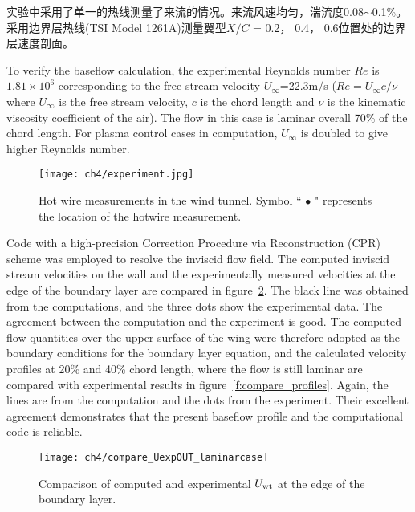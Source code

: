实验中采用了单一的热线测量了来流的情况。来流风速均匀，湍流度0.08$\sim$0.1\%。采用边界层热线(TSI Model 1261A)测量翼型$X/C$ = 0.2， 0.4， 0.6位置处的边界层速度剖面。

To verify the baseflow calculation, the experimental Reynolds number $Re$ is $1.81\times10^6$ corresponding to the free-stream velocity $U_\infty$=22.3m/s ($Re={U_\infty c}/{\nu}$ where $U_\infty$ is the free stream velocity, $c$ is the chord length and $\nu$ is the kinematic viscosity coefficient of the air). The flow in this case is laminar overall 70\% of the chord length. For plasma control cases in computation, $U_\infty$ is doubled to give higher Reynolds number.

\begin{figure}
  \centering
  \texttt{[image: ch4/experiment.jpg]}
  \caption{Hot wire measurements in the wind tunnel. Symbol `` $\bullet$ " represents the location of the hotwire measurement.}\label{f:experiment}
\end{figure}

Code with a high-precision Correction Procedure via Reconstruction (CPR) \cite{WangZJ2009,Zhu2016,Zh2017} scheme was employed to resolve the inviscid flow field. The computed inviscid stream velocities on the wall and the experimentally measured velocities at the edge of the boundary layer are compared in figure~\ref{f:ConpareInvicidV}. The black line was obtained from the computations, and the three dots show the experimental data. The agreement between the computation and the experiment is good. The computed  flow quantities over the upper surface of the wing were therefore adopted as the boundary conditions for the boundary layer equation, and the calculated velocity profiles at 20\% and 40\% chord length, where the flow is still laminar are compared with experimental results in figure~\ref{f:compare_profiles}. Again, the lines are from the computation and the dots from the experiment. Their excellent agreement demonstrates that the present baseflow profile and the computational code is reliable.
\begin{figure}
\centering
  \texttt{[image: ch4/compare\_UexpOUT\_laminarcase]}
\caption{Comparison of computed and experimental $U_{\rm{wt}}$ at the edge of the boundary layer.}
\label{f:ConpareInvicidV}
\end{figure}

